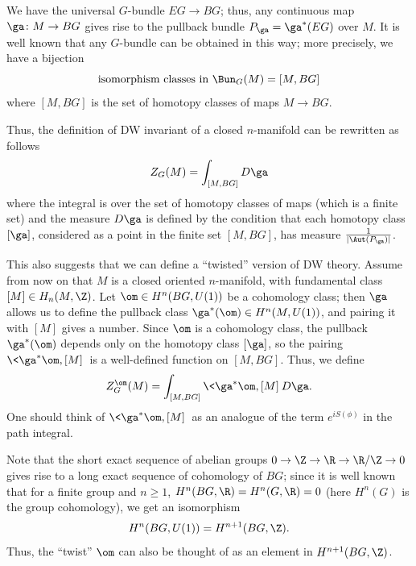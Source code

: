 We have the universal $G$-bundle $EG\to BG$; thus, any continuous map
$\ga\colon M\to BG$ gives rise to the pullback bundle
$P_\ga = \ga^*(EG)$ over $M$. It is well known that any $G$-bundle can be
obtained in this way; more precisely, we have a bijection
$$
\text{isomorphism classes in }\Bun_G(M)= [M, BG]
$$
where $[M,BG]$ is the set of homotopy classes of
maps $M\to BG$.

Thus, the definition of DW invariant of a closed $n$-manifold can
be rewritten as follows
$$
  Z_G(M)=\int_{[M, BG]} D\ga
$$
where the integral is over the set of homotopy classes of maps (which is a
finite set) and the measure $D\ga$ is defined by the condition that each
homotopy class $[\ga]$, considered as a point in the finite set $[M, BG]$, has
measure $\frac{1}{|\Aut(P_\ga)|}$.

This also suggests that we can define a ``twisted'' version of DW theory.
Assume from now on that $M$ is a closed oriented $n$-manifold, with
fundamental class $[M]\in H_n(M, \Z)$. Let
$\om\in H^n(BG, U(1))$ be a cohomology class; then $\ga$ allows us to
define the pullback class $\ga^*(\om)\in H^n(M, U(1))$, and pairing it with
$[M]$ gives a number. Since $\om$ is a cohomology class, the pullback
$\ga^*(\om)$ depends only on the homotopy class $[\ga]$, so the pairing
$\<\ga^* \om, [M]\>$ is a well-defined function on $[M, BG]$. Thus, we define
$$
  Z_G^\om (M)= \int_{[M, BG]}\<\ga^* \om, [M]\> D\ga.
$$
One should think of $\<\ga^* \om, [M]\>$ as an analogue of the term
$e^{iS(\phi)}$ in the path integral.

Note that the short exact sequence of abelian groups $0\to \Z\to \R \to \R/\Z\to
0$ gives rise to a long exact sequence of cohomology of $BG$; since it is well
known that for a finite group and $n\ge 1$, $H^n(BG, \R)=H^n(G,\R)=0$ (here
$H^n(G)$ is the group cohomology), we get an isomorphism
$$
  H^n(BG, U(1))=H^{n+1}(BG, \Z).
$$
Thus, the ``twist'' $\om$ can also be thought of as an element
in $H^{n+1}(BG,\Z)$.

\clearpage
